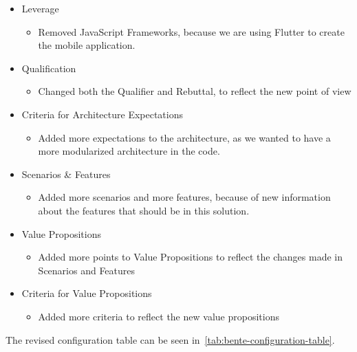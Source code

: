\begin{itemize}
    \item Leverage
    \begin{itemize}
        \item Removed JavaScript Frameworks, because we are using Flutter to create the mobile application.
    \end{itemize}
    \item Qualification
    \begin{itemize}
        \item Changed both the Qualifier and Rebuttal, to reflect the new point of view
    \end{itemize}
    \item Criteria for Architecture Expectations
    \begin{itemize}
        \item Added more expectations to the architecture, as we wanted to have a more modularized architecture in the code.
    \end{itemize}
    \item Scenarios \& Features
    \begin{itemize}
        \item Added more scenarios and more features, because of new information about the features that should be in this solution.
    \end{itemize}
    \item Value Propositions
    \begin{itemize}
        \item Added more points to Value Propositions to reflect the changes made in Scenarios and Features
    \end{itemize}
    \item Criteria for Value Propositions
    \begin{itemize}
        \item Added more criteria to reflect the new value propositions 
    \end{itemize}
\end{itemize}

The revised configuration table can be seen in~\autoref{tab:bente-configuration-table}.

